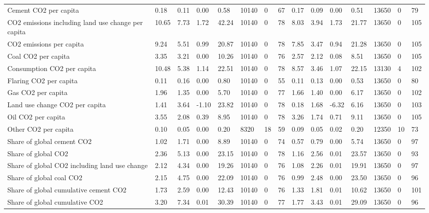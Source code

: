 \begin{longtable}{lllllllllllllll}
\addlinespace
Cement CO2 per capita & 0.18 & 0.11 & 0.00 & 0.58 & 10140 & 0 & 67 & 0.17 & 0.09 & 0.00 & 0.51 & 13650 & 0 & 79\\
CO2 emissions including land use change per capita & 10.65 & 7.73 & 1.72 & 42.24 & 10140 & 0 & 78 & 8.03 & 3.94 & 1.73 & 21.77 & 13650 & 0 & 105\\
CO2 emissions per capita & 9.24 & 5.51 & 0.99 & 20.87 & 10140 & 0 & 78 & 7.85 & 3.47 & 0.94 & 21.28 & 13650 & 0 & 105\\
Coal CO2 per capita & 3.35 & 3.21 & 0.00 & 10.26 & 10140 & 0 & 76 & 2.57 & 2.12 & 0.08 & 8.51 & 13650 & 0 & 105\\
Consumption CO2 per capita & 10.48 & 5.38 & 1.14 & 22.51 & 10140 & 0 & 78 & 8.57 & 3.46 & 1.07 & 22.15 & 13130 & 4 & 102\\
\addlinespace
Flaring CO2 per capita & 0.11 & 0.16 & 0.00 & 0.80 & 10140 & 0 & 55 & 0.11 & 0.13 & 0.00 & 0.53 & 13650 & 0 & 80\\
Gas CO2 per capita & 1.96 & 1.35 & 0.00 & 5.70 & 10140 & 0 & 77 & 1.66 & 1.40 & 0.00 & 6.17 & 13650 & 0 & 102\\
Land use change CO2 per capita & 1.41 & 3.64 & -1.10 & 23.82 & 10140 & 0 & 78 & 0.18 & 1.68 & -6.32 & 6.16 & 13650 & 0 & 103\\
Oil CO2 per capita & 3.55 & 2.08 & 0.39 & 8.95 & 10140 & 0 & 78 & 3.26 & 1.74 & 0.71 & 9.11 & 13650 & 0 & 105\\
Other CO2 per capita & 0.10 & 0.05 & 0.00 & 0.20 & 8320 & 18 & 59 & 0.09 & 0.05 & 0.02 & 0.20 & 12350 & 10 & 73\\
\addlinespace
Share of global cement CO2 & 1.02 & 1.71 & 0.00 & 8.89 & 10140 & 0 & 74 & 0.57 & 0.79 & 0.00 & 5.74 & 13650 & 0 & 97\\
Share of global CO2 & 2.36 & 5.13 & 0.00 & 23.15 & 10140 & 0 & 78 & 1.16 & 2.56 & 0.01 & 23.57 & 13650 & 0 & 93\\
Share of global CO2 including land use change & 2.12 & 4.34 & 0.00 & 19.26 & 10140 & 0 & 76 & 1.08 & 2.26 & 0.01 & 19.91 & 13650 & 0 & 97\\
Share of global coal CO2 & 2.15 & 4.75 & 0.00 & 22.09 & 10140 & 0 & 76 & 0.99 & 2.48 & 0.00 & 23.50 & 13650 & 0 & 96\\
Share of global cumulative cement CO2 & 1.73 & 2.59 & 0.00 & 12.43 & 10140 & 0 & 76 & 1.33 & 1.81 & 0.01 & 10.62 & 13650 & 0 & 101\\
\addlinespace
Share of global cumulative CO2 & 3.20 & 7.34 & 0.01 & 30.39 & 10140 & 0 & 77 & 1.77 & 3.43 & 0.01 & 29.09 & 13650 & 0 & 96\\

\end{longtable}
